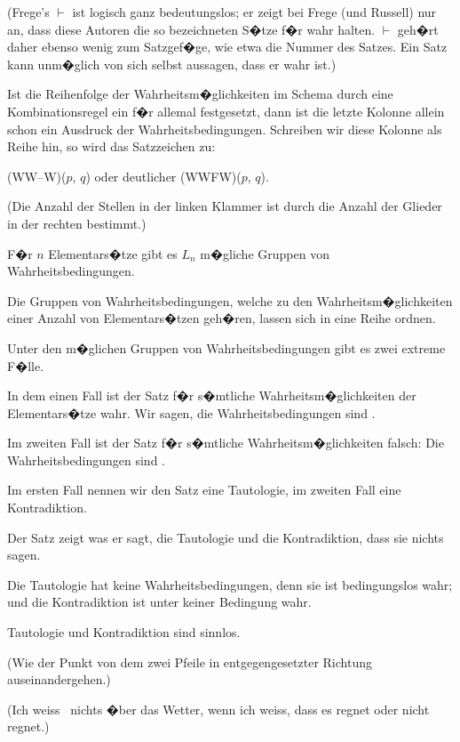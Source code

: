 \begin{propositions}
{(Frege's \glqq{}\grqq{} \glqq{}$\vdash$\grqq{} ist logisch ganz
bedeutungslos; er zeigt bei Frege (und Russell)
nur an, dass diese Autoren die so bezeichneten
S�tze f�r wahr halten. \glqq{}$\vdash$\grqq{} geh�rt daher ebenso
wenig zum Satzgef�ge, wie etwa die Nummer des
Satzes. Ein Satz kann unm�glich von sich selbst
aussagen, dass er wahr ist.)

Ist die Reihenfolge der Wahrheitsm�glichkeiten
im Schema durch eine Kombinationsregel ein f�r
allemal festgesetzt, dann ist die letzte Kolonne
allein schon ein Ausdruck der Wahrheitsbedingungen.
Schreiben wir diese Kolonne als Reihe
hin, so wird das Satzzeichen zu:

\glqq{}(WW--W)($p$, $q$)\grqq{} oder deutlicher \glqq{}(WWFW)($p$, $q$)\grqq{}.

(Die Anzahl der Stellen in der linken Klammer
ist durch die Anzahl der Glieder in der rechten
bestimmt.)}


{F�r $n$ Elementars�tze gibt es $L_{n}$ m�gliche Gruppen
von Wahrheitsbedingungen.

{\stretchyspace
Die Gruppen von Wahrheitsbedingungen,
welche zu den Wahrheitsm�glichkeiten einer
Anzahl von Elementars�tzen geh�ren, lassen sich
in eine Reihe ordnen.}}


{Unter den m�glichen Gruppen von Wahrheitsbedingungen
gibt es zwei extreme F�lle.

In dem einen Fall ist der Satz f�r s�mtliche
Wahrheitsm�glichkeiten der Elementars�tze wahr.
Wir sagen, die Wahrheitsbedingungen sind
.

Im zweiten Fall ist der Satz f�r s�mtliche
Wahrheitsm�glichkeiten falsch: Die Wahrheitsbedingungen
sind .

Im ersten Fall nennen wir den Satz eine
Tautologie, im zweiten Fall eine Kontradiktion.}


{Der Satz zeigt was er sagt, die Tautologie und
die Kontradiktion, dass sie nichts sagen.

Die Tautologie hat keine Wahrheitsbedingungen,
denn sie ist bedingungslos wahr; und
die Kontradiktion ist unter keiner Bedingung
wahr.

Tautologie und Kontradiktion sind sinnlos.

(Wie der Punkt von dem zwei Pfeile in
entgegengesetzter Richtung auseinandergehen.)

(Ich weiss \zumBeispiel\ nichts �ber das Wetter, wenn
ich weiss, dass es regnet oder nicht regnet.)}



\end{propositions}
